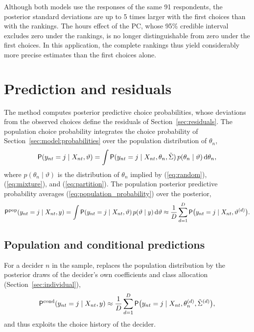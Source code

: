 \documentclass[article,shortnames]{jss}
\newcommand{\fct}[1]{\code{#1()}}
\begin{document}
%
Although both models use the responses of the same 91 respondents, the posterior
standard deviations are up to 5 times larger with the first choices than with
the rankings. The hours effect of the PC, whose 95\% credible interval excludes
zero under the rankings, is no longer distinguishable from zero under the first
choices. In this application, the complete rankings thus yield considerably more
precise estimates than the first choices alone.

\section{Prediction and residuals} \label{sec:prediction}

The \fct{predict} method computes posterior predictive choice probabilities,
whose deviations from the observed choices define the residuals of
Section~\ref{sec:residuals}. The population choice probability integrates the
choice probability of Section~\ref{sec:model:probabilities} over the population
distribution of $\theta_n$,
%
\begin{equation}
\label{eq:population_probability}
\mathsf{P}(y_{nt} = j \mid X_{nt}, \vartheta)
= \int \mathsf{P}(y_{nt} = j \mid X_{nt}, \theta_n, \tilde{\Sigma})\,
  p(\theta_n \mid \vartheta)\, \mathrm{d}\theta_n,
\end{equation}
%
where $p(\theta_n \mid \vartheta)$ is the distribution of $\theta_n$ implied by
(\ref{eq:random}), (\ref{eq:mixture}), and (\ref{eq:partition}). The
population posterior predictive probability averages
(\ref{eq:population_probability}) over the posterior,
%
\begin{equation}
\label{eq:posterior_predictive}
\mathsf{P}^{\mathrm{pop}}(y_{nt} = j \mid X_{nt}, y)
= \int \mathsf{P}(y_{nt} = j \mid X_{nt}, \vartheta)\, p(\vartheta \mid y)\,
  \mathrm{d}\vartheta
\approx \frac{1}{D} \sum_{d = 1}^{D}
  \mathsf{P}\big(y_{nt} = j \mid X_{nt}, \vartheta^{(d)}\big).
\end{equation}

\subsection{Population and conditional predictions} \label{sec:conditional}

For a decider $n$ in the sample,  replaces the
population distribution by the posterior draws of the decider's own coefficients
and class allocation (Section~\ref{sec:individual}),
%
\begin{equation}
\label{eq:conditional_predictive}
\mathsf{P}^{\mathrm{cond}}(y_{nt} = j \mid X_{nt}, y)
\approx \frac{1}{D} \sum_{d = 1}^{D}
  \mathsf{P}\big(y_{nt} = j \mid X_{nt}, \theta_n^{(d)},
  \tilde{\Sigma}^{(d)}\big),
\end{equation}
%
and thus exploits the choice history of the decider.
\end{document}
